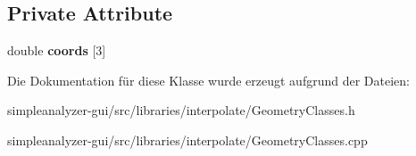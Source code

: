 \subsection*{Private Attribute}
\begin{DoxyCompactItemize}
\item 
\hypertarget{classVector3D_a1049b9da244f538b5c1f3ac700a776ee}{double {\bfseries coords} \mbox{[}3\mbox{]}}\label{classVector3D_a1049b9da244f538b5c1f3ac700a776ee}

\end{DoxyCompactItemize}


Die Dokumentation für diese Klasse wurde erzeugt aufgrund der Dateien\-:\begin{DoxyCompactItemize}
\item 
simpleanalyzer-\/gui/src/libraries/interpolate/Geometry\-Classes.\-h\item 
simpleanalyzer-\/gui/src/libraries/interpolate/Geometry\-Classes.\-cpp\end{DoxyCompactItemize}

